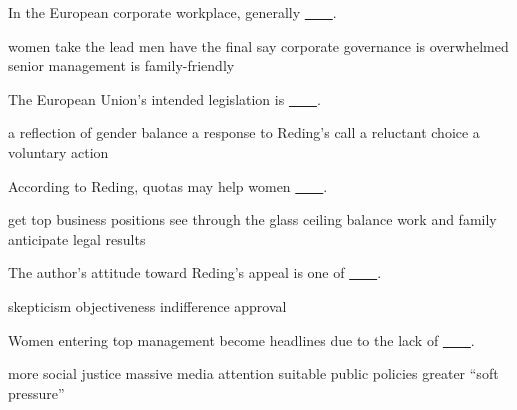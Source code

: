 \item In the European corporate workplace, generally \uline{~~~~}.
\begin{tasks}
	\task women take the lead
	\task men have the final say
	\task corporate governance is overwhelmed
	\task senior management is family-friendly
\end{tasks}
\item The European Union's intended legislation is \uline{~~~~}.
\begin{tasks}
	\task a reflection of gender balance
	\task a response to Reding's call
	\task a reluctant choice
	\task a voluntary action
\end{tasks}
\item According to Reding, quotas may help women \uline{~~~~}.
\begin{tasks}
	\task get top business positions
	\task see through the glass ceiling
	\task balance work and family
	\task anticipate legal results
\end{tasks}
\item The author's attitude toward Reding's appeal is one of \uline{~~~~}.
\begin{tasks}
	\task skepticism
	\task objectiveness
	\task indifference
	\task approval
\end{tasks}
\item Women entering top management become headlines due to the lack of \uline{~~~~}.
\begin{tasks}
	\task more social justice
	\task massive media attention
	\task suitable public policies
	\task greater ``soft pressure''
\end{tasks}